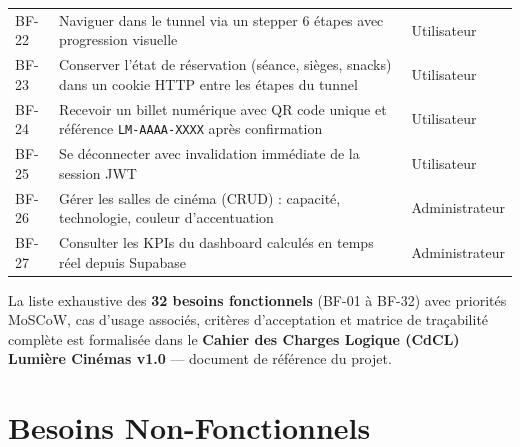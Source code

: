 \documentclass[12pt,a4paper,openany]{report}
\begin{document}
\begin{longtable}{lp{9cm}l}
  BF-22 & Naviguer dans le tunnel via un stepper 6 étapes avec progression visuelle & Utilisateur \\
  BF-23 & Conserver l'état de réservation (séance, sièges, snacks) dans un cookie HTTP entre les étapes du tunnel & Utilisateur \\
  BF-24 & Recevoir un billet numérique avec QR code unique et référence \texttt{LM-AAAA-XXXX} après confirmation & Utilisateur \\
  BF-25 & Se déconnecter avec invalidation immédiate de la session JWT & Utilisateur \\
  BF-26 & Gérer les salles de cinéma (CRUD) : capacité, technologie, couleur d'accentuation & Administrateur \\
  BF-27 & Consulter les KPIs du dashboard calculés en temps réel depuis Supabase & Administrateur \\
\end{longtable}

\begin{infobox}
\small La liste exhaustive des \textbf{32 besoins fonctionnels} (BF-01 à BF-32) avec priorités MoSCoW, cas d'usage associés, critères d'acceptation et matrice de traçabilité complète est formalisée dans le \textbf{Cahier des Charges Logique (CdCL) Lumière Cinémas v1.0} — document de référence du projet.
\end{infobox}

\section{Besoins Non-Fonctionnels}
\end{document}
